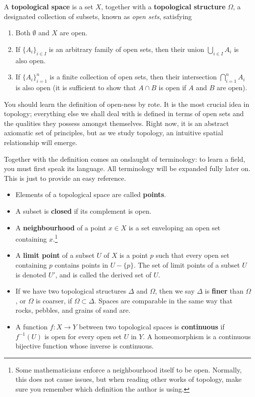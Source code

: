 A {\bf topological space} is a set $X$, together with a {\bf topological structure} $\Omega$, a designated collection of subsets, known as {\it open sets}, satisfying
%
\begin{enumerate}
    \item Both $\emptyset$ and $X$ are open.
    \item If $\{A_i\}_{i \in I}$ is an arbitrary family of open sets, then their union $\bigcup_{i \in I} A_i$ is also open.
    \item If $\{A_i\}_{i = 1}^n$ is a finite collection of open sets, then their intersection $\bigcap_{i = 1}^n A_i$ is also open (it is sufficient to show that $A \cap B$ is open if $A$ and $B$ are open).
\end{enumerate}
%
You should learn the definition of open-ness by rote. It is the most crucial idea in topology; everything else we shall deal with is defined in terms of open sets and the qualities they possess amongst themselves. Right now, it is an abstract axiomatic set of principles, but as we study topology, an intuitive spatial relationship will emerge.

Together with the definition comes an onslaught of terminology: to learn a field, you must first speak its language. All terminology will be expanded fully later on. This is just to provide an easy reference.

\begin{itemize}
    \item Elements of a topological space are called {\bf points}.
    \item A subset is {\bf closed} if its complement is open.
    \item A {\bf neighbourhood} of a point $x \in X$ is a set enveloping an open set containing $x$.\footnote{Some mathematicians enforce a neighbourhood itself to be open. Normally, this does not cause issues, but when reading other works of topology, make sure you remember which definition the author is using.}
    \item A {\bf limit point} of a subset $U$ of $X$ is a point $p$ such that every open set containing $p$ contains points in $U - \{p\}$. The set of limit points of a subset $U$ is denoted $U'$, and is called the derived set of $U$.
    \item If we have two topological structures $\Delta$ and $\Omega$, then we say $\Delta$ is {\bf finer} than $\Omega$, or $\Omega$ is coarser, if $\Omega \subset \Delta$. Spaces are comparable in the same way that rocks, pebbles, and grains of sand are.
    \item A function $f:X \to Y$ between two topological spaces is {\bf continuous} if $f^{-1}(U)$ is open for every open set $U$ in $Y$. A homeomorphism is a continuous bijective function whose inverse is continuous.
\end{itemize}

